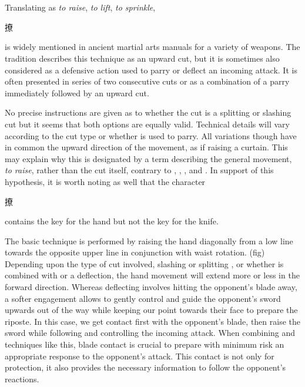\section{\Liao{}}
Translating as \textit{to raise}, \textit{to lift}, \textit{to sprinkle}, \Liao{} \begin{CJK*}{UTF8}{bsmi}撩\end{CJK*} is widely mentioned in ancient martial arts manuals for a variety of weapons. The \Yangjia{} \Michuan{} tradition describes this technique as an upward cut, but it is sometimes also considered as a defensive action used to parry or deflect an incoming attack. It is often presented in series of two consecutive cuts or as a combination of a \Liao{} parry immediately followed by an upward cut. 

No precise instructions are given as to whether the cut is a splitting or slashing cut but it seems that both options are equally valid. Technical details will vary according to the cut type or whether \Liao{} is used to parry.
All variations though have in common the upward direction of the movement, as if raising a curtain. This may explain why this \Jianfa{} is designated by a term describing the general movement, \textit{to raise}, rather than the cut itself, contrary to \Ci{}, \Pi{}, \Duo{}, and \Hua{}. In support of this hypothesis,  it is worth noting as well that the \Liao{} character \begin{CJK*}{UTF8}{bsmi}撩\end{CJK*} contains the key for the hand but not the key for the knife.

The basic \Liao{} technique is performed by raising the hand diagonally from a low line towards the opposite upper line in conjunction with waist rotation. (fig)
Depending upon the type of cut involved, slashing \Hua{} or splitting \Pi{}, or whether \Liao{} is combined with \Mo{} or a deflection, the hand movement will extend more or less in the forward direction. 
Whereas deflecting involves hitting the opponent's blade away, a softer engagement allows to gently control and guide the opponent's sword upwards out of the way while keeping our point towards their face to prepare the riposte. In this case, we get contact first with the opponent's blade, then raise the sword while following and controlling the incoming attack. When combining \Liao{} and \Mo{} techniques like this, blade contact is crucial to prepare with minimum risk an appropriate response to the opponent's attack. This contact is not only for protection, it also provides the necessary information to follow the opponent's reactions. 

